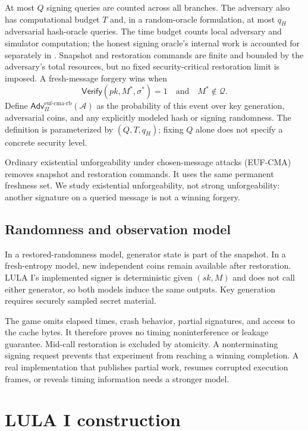 \documentclass[a4paper,envcountsame,runningheads]{llncs}
\newcommand{\Vf}{\mathsf{Verify}}
\newcommand{\Adv}{\mathsf{Adv}}
\begin{document}
At most $Q$ signing queries are counted across all branches. The adversary also has computational budget $T$ and, in a random-oracle formulation, at most $q_H$ adversarial hash-oracle queries. The time budget counts local adversary and simulator computation; the honest signing oracle's internal work is accounted for separately in . Snapshot and restoration commands are finite and bounded by the adversary's total resources, but no fixed security-critical restoration limit is imposed. A fresh-message forgery wins when
\begin{equation}\label{eq:win}
 \Vf(pk,M^*,\sigma^*)=1\quad\text{and}\quad M^*\notin\mathcal Q.
\end{equation}
Define $\Adv^{\mathrm{euf\text{-}cma\text{-}rb}}_{\Pi}(\mathcal A)$ as the probability of this event over key generation, adversarial coins, and any explicitly modeled hash or signing randomness. The definition is parameterized by $(Q,T,q_H)$; fixing $Q$ alone does not specify a concrete security level.

Ordinary existential unforgeability under chosen-message attacks (EUF-CMA) removes snapshot and restoration commands. It uses the same permanent freshness set. We study existential unforgeability, not strong unforgeability: another signature on a queried message is not a winning forgery.

\subsection{Randomness and observation model}
In a restored-randomness model, generator state is part of the snapshot. In a fresh-entropy model, new independent coins remain available after restoration. LULA I's implemented signer is deterministic given $(sk,M)$ and does not call either generator, so both models induce the same outputs. Key generation requires securely sampled secret material.

The game omits elapsed times, crash behavior, partial signatures, and access to the cache bytes. It therefore proves no timing noninterference or leakage guarantee. Mid-call restoration is excluded by atomicity. A nonterminating signing request prevents that experiment from reaching a winning completion. A real implementation that publishes partial work, resumes corrupted execution frames, or reveals timing information needs a stronger model.

\section{LULA I construction}\label{sec:construction}
\end{document}
